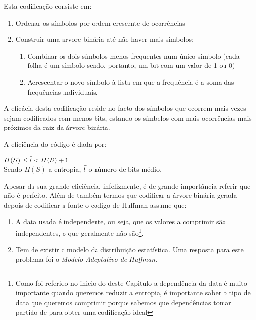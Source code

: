 \documentclass[11pt,journal,compsoc]{IEEEtran}
\begin{document}
Esta codificação consiste em:
\begin{enumerate}
    \item Ordenar os símbolos por ordem crescente de ocorrências
    \item Construir uma árvore binária até não haver mais símbolos:
    \begin{enumerate}
        \item Combinar os dois símbolos menos frequentes num único símbolo (cada folha é um símbolo sendo, portanto, um bit com um valor de 1 ou 0)
        \item Acrescentar o novo símbolo à lista em que a frequência é a soma das frequências individuais.
    \end{enumerate}
\end{enumerate}
A eficácia desta codificação reside no facto dos símbolos que ocorrem mais vezes sejam codificados com menos bits, estando os símbolos com mais ocorrências mais próximos da raiz da árvore binária.

A eficiência do código é dada por:
\begin{center}
\begin{math}H(S)\leq\Bar{l}<H(S)+1\end{math}\\
\small Sendo \begin{math}H(S)\end{math} a entropia, \begin{math}\Bar{l}\end{math} o número de bits médio.  
\end{center}

Apesar da sua grande eficiência, infelizmente, é de grande importância referir que não é perfeito. Além de também termos que codificar a árvore binária gerada depois de codificar a fonte o código de Huffman assume que:
\begin{enumerate}
    \item A data usada é independente, ou seja, que os valores a comprimir são independentes, o que geralmente não são\footnote{Como foi referido no inicio do deste Capitulo a dependência da data é muito importante quando queremos reduzir a entropia, é importante saber o tipo de data que queremos comprimir porque sabemos que dependências tomar partido de para obter uma codificação ideal}.
    \item Tem de existir o modelo da distribuição estatística. Uma resposta para este problema foi o \textit{Modelo Adaptativo de Huffman}.
\end{enumerate}
\end{document}
